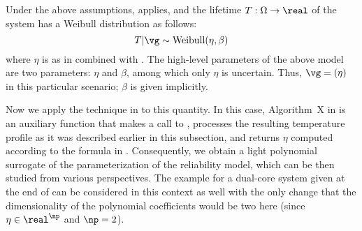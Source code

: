 Under the above assumptions,  applies, and the
lifetime $T: \Omega \to \real$ of the system has a Weibull distribution as
follows:
\[
  T | \vg \sim \mathrm{Weibull}(\eta, \beta)
\]
where $\eta$ is as in  combined with
. The high-level parameters of the above model are
two parameters: $\eta$ and $\beta$, among which only $\eta$ is uncertain.
Thus, $\vg = (\eta)$ in this particular scenario; $\beta$ is given implicitly.

Now we apply the technique in  to this quantity. In
this case, Algorithm~X in  is an auxiliary function
that makes a call to , processes the resulting
temperature profile as it was described earlier in this subsection, and returns
$\eta$ computed according to the formula in .
Consequently, we obtain a light polynomial surrogate of the parameterization of
the reliability model, which can be then studied from various perspectives. The
example for a dual-core system given at the end of 
can be considered in this context as well with the only change that the
dimensionality of the polynomial coefficients would be two here (since $\eta \in
\real^\np$ and $\np = 2$).
